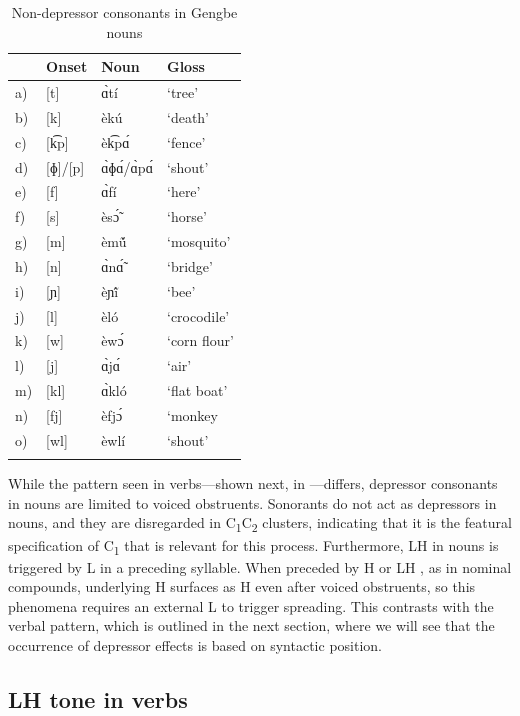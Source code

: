 \documentclass[output=paper,newtxmath,modfonts,nonflat,hidelinks]{langsci/langscibook}
\begin{document}
\begin{table}
\begin{tabularx}{.66\textwidth}{lllX}
\lsptoprule
&  Onset &  Noun &  Gloss\\
\midrule
a) & [t]     & ɑ̀tí  &  {‘tree’}\\
b) & [k]     & èkú  &  {‘death’}\\
c) & [k͡p]    & èk͡pɑ́ &  {‘fence’} \\
d) & [ɸ]/[p] & ɑ̀ɸɑ́/ɑ̀pɑ́ &  {‘shout’}\\
e) & [f]     & ɑ̀fí  &  {‘here’}\\
f) & [s]     & èsɔ̃́  &  {‘horse’}\\
g) & [m]     & èmṹ  &  {‘mosquito’}\\
h) & [n]     & ɑ̀nɑ̃́  &  {‘bridge’}\\
i) & [ɲ]     & èɲĩ́  &  {‘bee’}\\
j) & [l]     & èló  &  {‘crocodile’}\\
k) & [w]     & èwɔ́  &  {‘corn flour’}\\
l) & [j]     & ɑ̀jɑ́  &  {‘air’}\\
m) & [kl]    & ɑ̀kló &  {‘flat boat’}\\
n) & [fj]    & èfjɔ́ &  {‘monkey}\\
o) & [wl]    & èwlí &  {‘shout’}\\
\lspbottomrule
\end{tabularx}
\caption{Non-depressor consonants in Gengbe nouns}
\label{tab:lotven:4}
\end{table}

While the pattern seen in verbs—shown next, in —differs, depressor consonants in nouns are limited to voiced obstruents. Sonorants do not act as depressors in nouns, and they are disregarded in C\textsubscript{1}C\textsubscript{2} clusters, indicating that it is the featural specification of C\textsubscript{1} that is relevant for this process. Furthermore, LH  in nouns is triggered by L  in a preceding syllable. When preceded by H or LH , as in nominal compounds, underlying H surfaces as H even after voiced obstruents, so this phenomena requires an external L  to trigger spreading. This contrasts with the verbal pattern, which is outlined in the next section, where we will see that the occurrence of depressor effects is based on syntactic position.

\subsection{LH tone in verbs}\label{sec:lotven:4.2}
\end{document}
